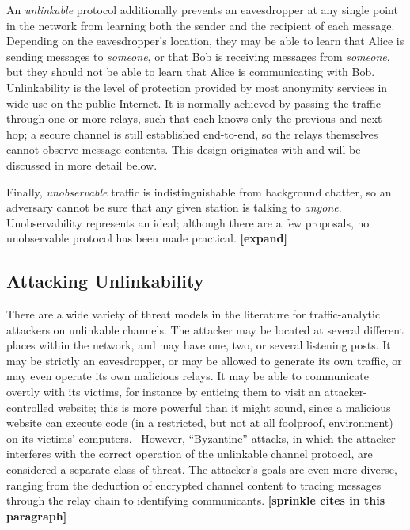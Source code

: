 \documentclass{zarticle}
\def\todo#1{{\color{todocolor}\bfseries [#1]}}
\begin{document}
An \emph{unlinkable} protocol additionally prevents an eavesdropper at
any single point in the network from learning both the sender and the
recipient of each message.  Depending on the eavesdropper's location,
they may be able to learn that Alice is sending messages to
\emph{someone}, or that Bob is receiving messages from \emph{someone},
but they should not be able to learn that Alice is communicating with
Bob.  Unlinkability is the level of protection provided by most
anonymity services in wide use on the public Internet.  It is normally
achieved by passing the traffic through one or more relays, such that
each knows only the previous and next hop; a secure channel is still
established end-to-end, so the relays themselves cannot observe
message contents.  This design originates with \textcite{chaum1981mix}
and will be discussed in more detail below.

Finally, \emph{unobservable} traffic is indistinguishable from
background chatter, so an adversary cannot be sure that any given
station is talking to \emph{anyone}.  Unobservability represents an
ideal; although there are a few proposals, no unobservable protocol
has been made practical.  \todo{expand}

\subsection{Attacking Unlinkability}

There are a wide variety of threat models in the literature for
traffic-analytic attackers on unlinkable channels.  The attacker may
be located at several different places within the network, and may
have one, two, or several listening posts.  It may be strictly an
eavesdropper, or may be allowed to generate its own traffic, or may
even operate its own malicious relays.  It may be able to communicate
overtly with its victims, for instance by enticing them to visit an
attacker-controlled website; this is more powerful than it might
sound, since a malicious website can execute code (in a restricted,
but not at all foolproof, environment) on its victims'
computers.~\cite{barth2008securing} However, “Byzantine” attacks, in
which the attacker interferes with the correct operation of the
unlinkable channel protocol, are considered a separate class of
threat.  The attacker's goals are even more diverse, ranging from
the deduction of encrypted channel content to tracing messages through
the relay chain to identifying communicants. \todo{sprinkle cites in
  this paragraph}
\end{document}
